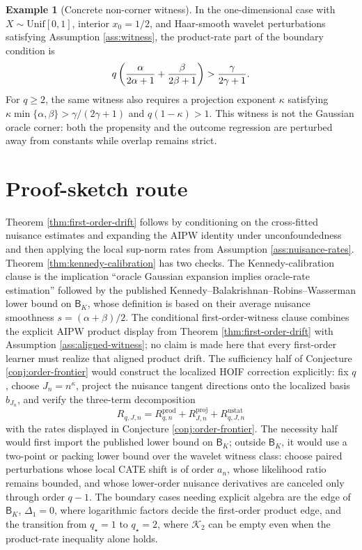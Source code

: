 \documentclass[11pt]{article}
\theoremstyle{definition}
\newtheorem{example}{Example}
\theoremstyle{plain}
\theoremstyle{remark}
\begin{document}
\begin{example}[Concrete non-corner witness]\label{ex:wavelet-witness}
In the one-dimensional case with \(X\sim \mathrm{Unif}[0,1]\), interior
\(x_0=1/2\), and Haar-smooth wavelet perturbations satisfying Assumption
\ref{ass:witness}, the product-rate part of the boundary condition is
\[
q\left({\alpha\over 2\alpha+1}+{\beta\over 2\beta+1}\right)
>{\gamma\over 2\gamma+1}.
\]
For \(q\ge2\), the same witness also requires a projection exponent
\(\kappa\) satisfying \(\kappa\min\{\alpha,\beta\}>\gamma/(2\gamma+1)\) and
\(q(1-\kappa)>1\).  This witness is not the Gaussian oracle corner: both the
propensity and the outcome regression are perturbed away from constants while
overlap remains strict.
\end{example}

\section{Proof-sketch route}
Theorem \ref{thm:first-order-drift} follows by conditioning on the
cross-fitted nuisance estimates and expanding the AIPW identity under
unconfoundedness and then applying the local sup-norm rates from Assumption
\ref{ass:nuisance-rates}.  Theorem \ref{thm:kennedy-calibration} has two
checks.  The Kennedy-calibration clause is the implication ``oracle Gaussian
expansion implies oracle-rate estimation'' followed by the published
Kennedy--Balakrishnan--Robins--Wasserman lower bound on \(\mathsf B_K\),
whose definition is based on their average nuisance smoothness
\(s=(\alpha+\beta)/2\).  The conditional first-order-witness clause combines
the explicit AIPW product display from Theorem \ref{thm:first-order-drift}
with Assumption \ref{ass:aligned-witness}; no claim is made here that every
first-order learner must realize that aligned product drift.  The sufficiency
half of Conjecture
\ref{conj:order-frontier} would construct the localized HOIF correction
explicitly: fix \(q\), choose \(J_n=n^\kappa\), project the nuisance tangent
directions onto the localized basis \(b_{J_n}\), and verify the three-term
decomposition
\[
R_{q,J,n}=R^{\mathrm{prod}}_{q,n}+R^{\mathrm{proj}}_{J,n}
 +R^{\mathrm{ustat}}_{q,J,n}
\]
with the rates displayed in Conjecture \ref{conj:order-frontier}.  The
necessity half would first import the published lower bound on
\(\mathsf B_K\); outside \(\mathsf B_K\), it would use a two-point or packing
lower bound over the wavelet witness class: choose paired perturbations whose
local CATE shift is of order \(a_n\), whose likelihood ratio remains bounded,
and whose lower-order nuisance derivatives are canceled only through order
\(q-1\).  The boundary cases needing explicit algebra are the edge of
\(\mathsf B_K\), \(\Delta_1=0\), where logarithmic factors decide the
first-order product edge, and the transition from \(q_\star=1\) to
\(q_\star=2\), where \(\mathcal K_2\) can be empty even when the product-rate
inequality alone holds.
\end{document}
